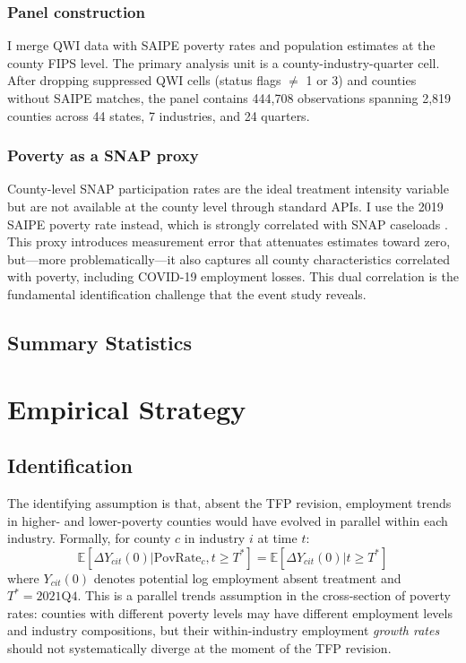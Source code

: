 \documentclass[12pt]{article}
\newcommand{\E}{\mathbb{E}}
\begin{document}
\subsubsection*{Panel construction} I merge QWI data with SAIPE poverty rates and population estimates at the county FIPS level. The primary analysis unit is a county-industry-quarter cell. After dropping suppressed QWI cells (status flags $\neq$ 1 or 3) and counties without SAIPE matches, the panel contains 444,708 observations spanning 2,819 counties across 44 states, 7 industries, and 24 quarters.

\subsubsection*{Poverty as a SNAP proxy} County-level SNAP participation rates are the ideal treatment intensity variable but are not available at the county level through standard APIs. I use the 2019 SAIPE poverty rate instead, which is strongly correlated with SNAP caseloads \citep{ziliak2016}. This proxy introduces measurement error that attenuates estimates toward zero, but---more problematically---it also captures all county characteristics correlated with poverty, including COVID-19 employment losses. This dual correlation is the fundamental identification challenge that the event study reveals.

\subsection{Summary Statistics}




\section{Empirical Strategy}

\subsection{Identification}

The identifying assumption is that, absent the TFP revision, employment trends in higher- and lower-poverty counties would have evolved in parallel within each industry. Formally, for county $c$ in industry $i$ at time $t$:
\begin{equation}
\E[\Delta Y_{cit}(0) | \text{PovRate}_c, t \geq T^*] = \E[\Delta Y_{cit}(0) | t \geq T^*]
\end{equation}
where $Y_{cit}(0)$ denotes potential log employment absent treatment and $T^* = 2021\text{Q4}$. This is a parallel trends assumption in the cross-section of poverty rates: counties with different poverty levels may have different employment levels and industry compositions, but their within-industry employment \textit{growth rates} should not systematically diverge at the moment of the TFP revision.
\end{document}

